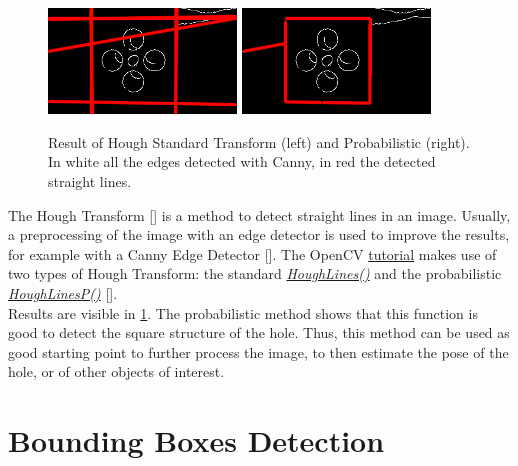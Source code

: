 \begin{figure}[H]
	\centering
		\includegraphics[width=5.0cm]{canny_HoughStandard}
		\qquad
		\includegraphics[width=5.0cm]{canny_HoughProb}
	\caption[Result of Standard Hough Transform and Probabilistic one]{Result of Hough Standard Transform (left) and Probabilistic (right). In white all the edges detected with Canny, in red the detected straight lines.}
	\label{fig:HoughStandard}
\end{figure}

The Hough Transform [\cite{DudaHoughTrasf}] is a method to detect straight lines in an image. Usually, a preprocessing of the image with an edge detector is used to improve the results, for example with a Canny Edge Detector [\cite{CannyEdge}]. The OpenCV \href{https://docs.opencv.org/3.4/d9/db0/tutorial_hough_lines.html}{tutorial} makes use of two types of Hough Transform: the standard \href{https://docs.opencv.org/3.4/dd/d1a/group__imgproc__feature.html#ga46b4e588934f6c8dfd509cc6e0e4545a}{\textit{HoughLines()}} and the probabilistic \href{https://docs.opencv.org/3.4/dd/d1a/group__imgproc__feature.html#ga8618180a5948286384e3b7ca02f6feeb}{\textit{HoughLinesP()}} [\cite{houghprob}].\\
Results are visible in \ref{fig:HoughStandard}. The probabilistic method shows that this function is good to detect the square structure of the hole. 
Thus, this method can be used as good starting point to further process the image, to then estimate the pose of the hole, or of other objects of interest.

\section{Bounding Boxes Detection}

